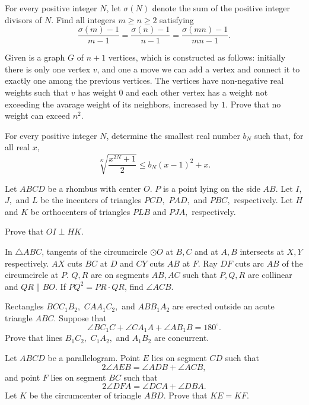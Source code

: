 \documentclass[11pt]{scrartcl}
\begin{document}
\begin{problem}[1612300762204186997]
For every positive integer $N$, let $\sigma(N)$ denote the sum of the positive integer divisors of $N$. Find all integers $m\geq n\geq 2$ satisfying\[\frac{\sigma(m)-1}{m-1}=\frac{\sigma(n)-1}{n-1}=\frac{\sigma(mn)-1}{mn-1}.\]
\end{problem}
\begin{problem}[493735785757154]
	Given is a graph $G$ of $n+1$ vertices, which is constructed as follows: initially there is only one vertex $v$, and one a move we can add a vertex and connect it to exactly one among the previous vertices. The vertices have non-negative real weights such that $v$ has weight $0$ and each other vertex has a weight not exceeding the avarage weight of its neighbors, increased by $1$. Prove that no weight can exceed $n^2$.
\end{problem}
\begin{problem}[7500559455615129254]
For every positive integer $N$, determine the smallest real number $b_{N}$ such that, for all real $x$,
\[
\sqrt[N]{\frac{x^{2 N}+1}{2}} \leqslant b_{N}(x-1)^{2}+x .
\]
\end{problem}
\begin{problem}[857598260795435]
Let $ ABCD $ be a rhombus with center $ O. $ $ P $ is a point lying on the side $ AB. $ Let $ I, $ $ J, $ and $ L $ be the incenters of triangles $ PCD, $ $ PAD, $ and $PBC, $ respectively. Let $ H $ and $ K $ be orthocenters of triangles $ PLB $ and $ PJA, $ respectively.

Prove that $ OI \perp HK. $
\end{problem}
\begin{problem}[162618813015033]
In $\triangle {ABC}$, tangents of the circumcircle $\odot {O}$ at $B, C$ and at $A, B$ intersects at $X, Y$ respectively. $AX$ cuts $BC$ at ${D}$ and $CY$ cuts $AB$ at ${F}$. Ray $DF$ cuts arc $AB$ of the circumcircle at ${P}$. $Q, R$ are on segments $AB, AC$ such that $P, Q, R$ are collinear and $QR \parallel BO$. If $PQ^2=PR \cdot QR$, find $\angle ACB$.
\end{problem}
\begin{problem}[942225649898797]
Rectangles $BCC_1B_2,$ $CAA_1C_2,$ and $ABB_1A_2$ are erected outside an acute triangle $ABC.$ Suppose that\[\angle BC_1C+\angle CA_1A+\angle AB_1B=180^{\circ}.\]Prove that lines $B_1C_2,$ $C_1A_2,$ and $A_1B_2$ are concurrent.
\end{problem}
\begin{problem}[6190379360381554657]
	Let $ABCD$ be a parallelogram. Point $E$ lies on segment $CD$ such that\[2\angle AEB=\angle ADB+\angle ACB,\]and point $F$ lies on segment $BC$ such that\[2\angle DFA=\angle DCA+\angle DBA.\]Let $K$ be the circumcenter of triangle $ABD$. Prove that $KE=KF$.
\end{problem}
\end{document}
